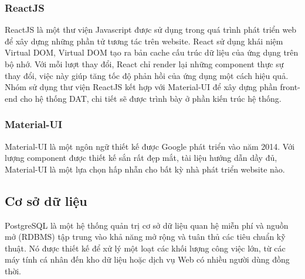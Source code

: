 \subsubsection{ReactJS}
ReactJS là một thư viện Javascript được sử dụng trong quá trình phát triển web để xây dựng những phần tử tương tác trên website. React sử dụng khái niệm Virtual DOM, Virtual DOM tạo ra bản cache cấu trúc dữ liệu của ứng dụng trên bộ nhớ. Với mỗi lượt thay đổi, React chỉ render lại những component thực sự thay đổi, việc này giúp tăng tốc độ phản hồi của ứng dụng một cách hiệu quả.\\
\indent Nhóm sử dụng thư viện ReactJS kết hợp với Material-UI để xây dựng phần front-end cho hệ thống DAT, chi tiết sẽ được trình bày ở phần kiến trúc hệ thống. 

\subsubsection{Material-UI}
Material-UI là một ngôn ngữ thiết kế được Google phát triển vào năm 2014. Với lượng component được thiết kế sắn rất đẹp mắt, tài liệu hướng dẫn dầy đủ, Material-UI là một lựa chọn hấp nhẫn cho bất kỳ nhà phát triển website nào.

\subsection{Cơ sở dữ liệu}


PostgreSQL là một hệ thống quản trị cơ sở dữ liệu quan hệ miễn phí và nguồn mở (RDBMS) tập trung vào khả năng mở rộng và tuân thủ các tiêu chuẩn kỹ thuật. Nó được thiết kế để xử lý một loạt các khối lượng công việc lớn, từ các máy tính cá nhân đến kho dữ liệu hoặc dịch vụ Web có nhiều người dùng đồng thời.

